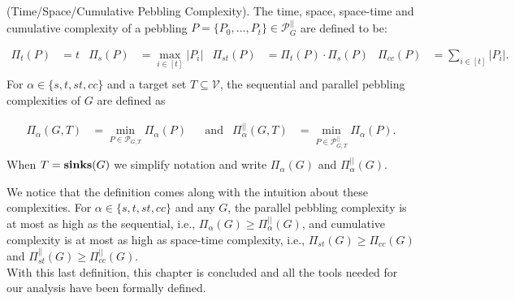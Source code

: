 %
\begin{definition}{(Time/Space/Cumulative Pebbling Complexity).}\textnormal{\cite{cryptoeprint:2016:875}}
  The time, space, space-time and cumulative complexity of a pebbling $P=\{ P_0,\dots,P_t \} \in \mathcal{P}_{G}^{||}$ are defined to be:

  \begin{align*}
    \Pi_t(P)&= t  &  \Pi_s(P)&= \underset{i \in [t]}{\max} \lvert P_i \rvert &  \Pi_{st}(P)&= \Pi_t(P) \cdot \Pi_s(P) & \Pi_{cc}(P)&= \underset{i \in [t]}{\sum} \lvert P_i \rvert .\\
  \end{align*}
  For $\alpha \in \{ s,t,st,cc \}$ and a target set $T \subseteq \mathcal{V}$, the sequential and parallel pebbling complexities of $G$ are defined as

  \begin{align*}
    \Pi_\alpha(G,T)&= \underset{P \in \mathcal{P}_{G,T}}{\min} \Pi_{\alpha}(P) &  &\mbox{and} & \Pi_{\alpha}^{||}(G,T)&= \underset{P \in \mathcal{P}_{G,T}^{||}}{\min} \Pi_{\alpha}(P) .\\
  \end{align*}
  When $T=\mbox{\textbf{sinks}}(G)$ we simplify notation and write $\Pi_{\alpha}(G)$ and $\Pi_{\alpha}^{||}(G)$.
%
\end{definition}
We notice that the definition comes along with the intuition about these complexities. For $\alpha \in \{ s,t,st,cc \}$ and any $G$, the parallel pebbling complexity is at most as high as the sequential,
i.e., $\Pi_\alpha(G) \geq \Pi_{\alpha}^{||}(G)$, and cumulative complexity is at most as high as space-time complexity, i.e., $\Pi_{st}(G) \geq \Pi_{cc}(G)$ and $\Pi_{st}^{||}(G) \geq \Pi_{cc}^{||}(G)$.\\

\noindent With this last definition, this chapter is concluded and all the tools needed for our analysis have been formally defined.
%
